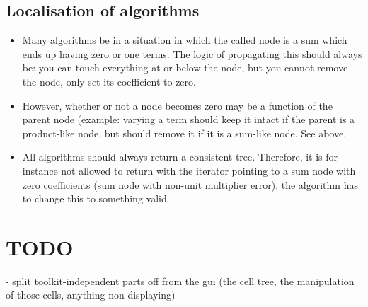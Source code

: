 \documentclass[11pt]{article}
\begin{document}
\subsection{Localisation of algorithms}

\begin{itemize}
\item Many algorithms be in a situation in which the called
  node is a sum which ends up having zero or one terms. The logic of
  propagating this should always be: you can touch everything at or
  below the node, but you cannot remove the node, only set its
  coefficient to zero. 

\item However, whether or not a node becomes zero may be a function of
  the parent node (example: varying a term should keep it intact if
  the parent is a product-like node, but should remove it if it is a
  sum-like node. See above.

\item All algorithms should always return a consistent
  tree. Therefore, it is for instance not allowed to return with the
  iterator pointing to a sum node with zero coefficients (sum node
  with non-unit multiplier error), the algorithm has to change this to
  something valid.

\end{itemize}


\section{TODO}

- split toolkit-independent parts off from the gui (the cell tree,
  the manipulation of those cells, anything non-displaying)
\end{document}
